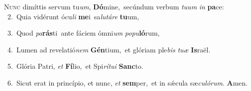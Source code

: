 \lettrine{\initial\textcolor{\initialcolor}{N}}{unc} dimíttis servum tu\-\textit{um}\-, \textbf{Dó}\-mine,~\star secúndum verbum \textit{tu}\-\textit{um} \textit{in} \textbf{pa}\-ce:\\
{\numbfont\textcolor{\numbcolor}{~2.}}~Quia vidérunt ócu\textit{li} \textbf{me}\-i~\star sa\-\textit{lu}\-\textit{tá}\textit{re} \textbf{tu}\-um,\par
{\numbfont\textcolor{\numbcolor}{~3.}}~Quod \textit{pa}\-\textbf{rás}ti~\star ante fáciem ómni\textit{um} \textit{po}\-\textit{pu}\textbf{ló}rum,\par
{\numbfont\textcolor{\numbcolor}{~4.}}~Lumen ad revelatió\textit{nem} \textbf{Gén}\-tium,~\star et glóriam ple\textit{bis} \textit{tu}\-\textit{æ} \textbf{Is}\-raël.\par
{\numbfont\textcolor{\numbcolor}{~5.}}~Glória Patri, \textit{et} \textbf{Fí}\-lio,~\star et Spi\-\textit{rí}\-\textit{tu}\textit{i} \textbf{Sanc}\-to.\par
{\numbfont\textcolor{\numbcolor}{~6.}}~Sicut erat in princípio, et nunc, \textit{et} \textbf{sem}\-per,~\star et in sǽcula sæ\-\textit{cu}\-\textit{ló}\textit{rum}. \textbf{A}\-men.\par
